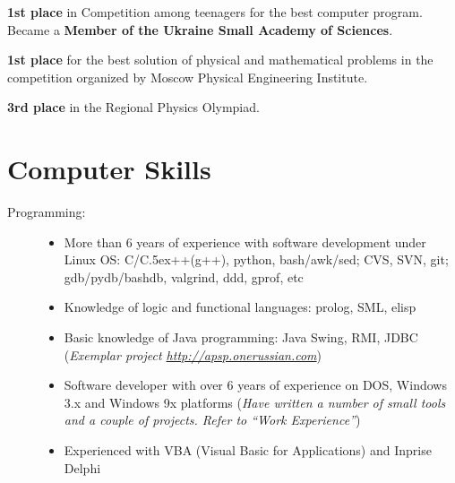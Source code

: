 \documentclass[10pt,overlapped,line]{res}
\def\Cplusplus{{\rm C\raise.5ex\hbox{\small ++}}}
\newcommand{\mplace}[1]{\textbf{#1}}
\newcommand{\wdescription}[1]{({\small \textit{#1}})}
\begin{document}
\begin{resume}
 \begin{position}
   \mplace{1st place} in Competition among teenagers for the best
   computer program. Became a \mplace{Member of the Ukraine Small Academy
     of Sciences}.
 \end{position}

 \begin{position}
   \mplace{1st place} for the best solution of physical and mathematical
   problems in the competition organized by Moscow Physical Engineering Institute.
 \end{position}

 \begin{position}
   \mplace{3rd place} in the Regional Physics Olympiad.

 \end{position}

 \section{Computer Skills}
  \begin{description}

    \item[Programming:]\hspace*{\fill}
      \begin{itemize}
      \item More than 6 years of experience with software development
        under Linux OS: C/\Cplusplus(g++), python, bash/awk/sed;
        CVS, SVN, git; gdb/pydb/bashdb, valgrind, ddd, gprof, etc

      \item Knowledge of logic and functional languages: prolog, SML,
        elisp

      \item Basic knowledge of Java programming: Java Swing, RMI, JDBC
        \wdescription{Exemplar project
          \url{http://apsp.onerussian.com}}

      \item Software developer with over 6 years of experience on DOS,
        Windows 3.x and Windows 9x platforms
        \wdescription{Have written a number of small tools and a couple of
          projects. Refer to ``Work Experience''}

      \item Experienced with VBA (Visual Basic for Applications) and
        Inprise Delphi


\end{itemize}
\end{description}
\end{resume}
\end{document}
